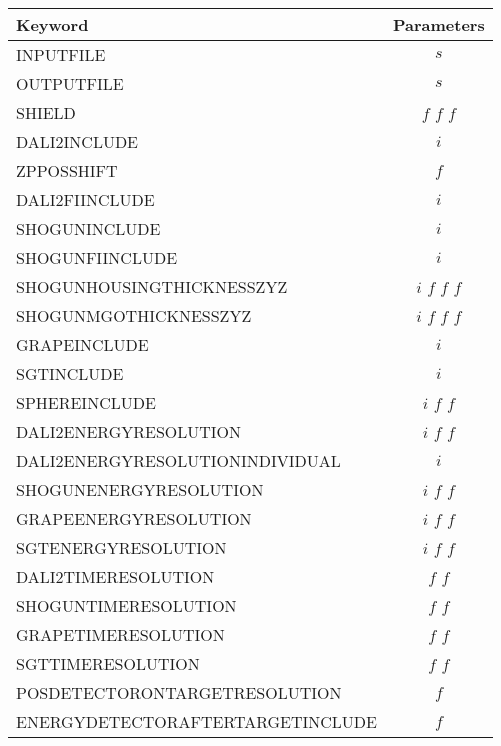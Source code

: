 \documentclass[12pt]{book}
\begin{document}
\begin{table}
  \centering
  \label{tab:EVENTBUILDERKEY}
  \begin{tabular}{|l||c|}
    \hline
    Keyword & Parameters \\
    \hline
    \hline
    INPUTFILE                        & $s$             \\
    OUTPUTFILE                       & $s$             \\
    SHIELD                           & $f$ $f$ $f$     \\
    DALI2INCLUDE                     & $i$             \\
    ZPPOSSHIFT                       & $f$             \\
    DALI2FIINCLUDE                   & $i$             \\
    SHOGUNINCLUDE                    & $i$             \\
    SHOGUNFIINCLUDE                  & $i$             \\
    SHOGUNHOUSINGTHICKNESSZYZ        & $i$ $f$ $f$ $f$ \\
    SHOGUNMGOTHICKNESSZYZ            & $i$ $f$ $f$ $f$ \\
    GRAPEINCLUDE                     & $i$             \\
    SGTINCLUDE                       & $i$             \\
    SPHEREINCLUDE                    & $i$ $f$ $f$     \\
    DALI2ENERGYRESOLUTION            & $i$ $f$ $f$     \\
    DALI2ENERGYRESOLUTIONINDIVIDUAL  & $i$             \\
    SHOGUNENERGYRESOLUTION           & $i$ $f$ $f$     \\
    GRAPEENERGYRESOLUTION            & $i$ $f$ $f$     \\
    SGTENERGYRESOLUTION              & $i$ $f$ $f$     \\
    DALI2TIMERESOLUTION              & $f$ $f$         \\
    SHOGUNTIMERESOLUTION             & $f$ $f$         \\
    GRAPETIMERESOLUTION              & $f$ $f$         \\
    SGTTIMERESOLUTION                & $f$ $f$         \\
    POSDETECTORONTARGETRESOLUTION    & $f$             \\
    ENERGYDETECTORAFTERTARGETINCLUDE & $f$             \\

\end{tabular}
\end{table}
\end{document}
